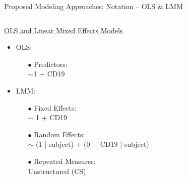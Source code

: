 \documentclass[11pt]{beamer}
\begin{document}
\begin{frame}{Proposed Modeling Approaches: Notation -- OLS \& LMM}
\begin{columns}
\begin{column}{0.55\textwidth}
\vspace{5pt}
\underline{OLS and Linear Mixed Effects Models}
\begin{itemize}
		\setlength{\itemsep}{1\baselineskip}
	\item OLS:
	\begin{itemize}
			\setlength{\itemsep}{1\baselineskip}
		\item[$\bullet$] Predictors: \\
		$\sim$1 + CD19
	\end{itemize}
	\item LMM: 
	\begin{itemize}
			\setlength{\itemsep}{1\baselineskip}
		\item[$\bullet$] Fixed Effects:\\
		$\sim$ 1 + CD19
		\item[$\bullet$] Random Effects: \\
		 $\sim$ \footnotesize{(1 | subject) + (0 + CD19 | subject)}
		\item[$\bullet$] Repeated Measures: \\
		Unstructured (CS)
	\end{itemize}
\end{itemize}
\end{column}

\end{columns}

\end{frame}
\end{document}
